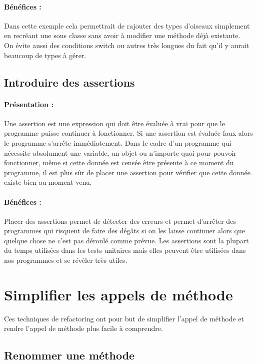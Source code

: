 \documentclass[a4paper,twoside,12pt,openright]{report}
\begin{document}
\paragraph{Bénéfices :}
Dans cette exemple cela permettrait de rajouter des types d'oiseaux simplement en recréant une sous classe sans avoir à modifier une méthode déjà existante.\\
On évite aussi des conditions switch ou autres très longues du fait qu'il y aurait beaucoup de types à gérer.\\

\subsection{Introduire des assertions}
\paragraph{Présentation :}
Une assertion est une expression qui doit être évaluée à vrai pour que le programme puisse continuer à fonctionner. Si une assertion est évaluée faux alors le programme s'arrête immédiatement.
Dans le cadre d'un programme qui nécessite absolument une variable, un objet ou n'importe quoi pour pouvoir fonctionner, même si cette donnée est censée être présente à ce moment du programme, il est plus sûr de placer une assertion pour vérifier que cette donnée existe bien au moment venu.

\paragraph{Bénéfices :}
Placer des assertions permet de détecter des erreurs et permet d'arrêter des programmes qui risquent de faire des dégâts si on les laisse continuer alors que quelque chose ne c'est pas déroulé comme prévue.
Les assertions sont la plupart du temps utilisées dans les tests unitaires mais elles peuvent être utilisées dans nos programmes et se révéler très utiles.\\

\newpage
\section{Simplifier les appels de méthode}
Ces techniques de refactoring ont pour but de simplifier l'appel de méthode et rendre l'appel de méthode plus facile à comprendre.\\



\subsection{Renommer une méthode}
\end{document}

